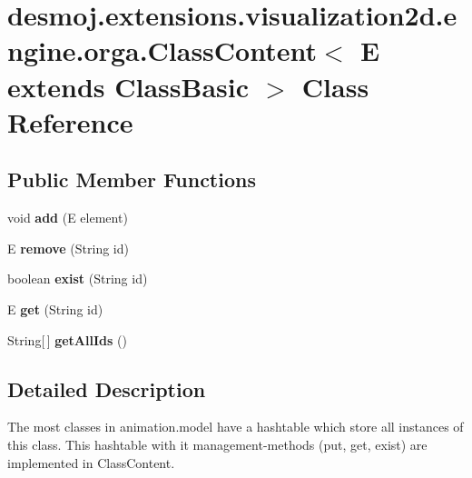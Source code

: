 \section{desmoj.\-extensions.\-visualization2d.\-engine.\-orga.\-Class\-Content$<$ E extends Class\-Basic $>$ Class Reference}
\label{classdesmoj_1_1extensions_1_1visualization2d_1_1engine_1_1orga_1_1_class_content_3_01_e_01extends_01_class_basic_01_4}
\subsection*{Public Member Functions}
\begin{DoxyCompactItemize}
\item 
void {\bfseries add} (E element)\label{classdesmoj_1_1extensions_1_1visualization2d_1_1engine_1_1orga_1_1_class_content_3_01_e_01extends_01_class_basic_01_4_a566ec81c9cf5318c56b14a6bfaae3496}

\item 
E {\bfseries remove} (String id)\label{classdesmoj_1_1extensions_1_1visualization2d_1_1engine_1_1orga_1_1_class_content_3_01_e_01extends_01_class_basic_01_4_a77266b23f22a7254b2f964ccc2f2f4f8}

\item 
boolean {\bfseries exist} (String id)\label{classdesmoj_1_1extensions_1_1visualization2d_1_1engine_1_1orga_1_1_class_content_3_01_e_01extends_01_class_basic_01_4_a4b407acd1d61c18869d7374e68994487}

\item 
E {\bfseries get} (String id)\label{classdesmoj_1_1extensions_1_1visualization2d_1_1engine_1_1orga_1_1_class_content_3_01_e_01extends_01_class_basic_01_4_a72f0ae45fbca25d3fa3935b7dd2cd9e9}

\item 
String[$\,$] {\bfseries get\-All\-Ids} ()\label{classdesmoj_1_1extensions_1_1visualization2d_1_1engine_1_1orga_1_1_class_content_3_01_e_01extends_01_class_basic_01_4_a311ece6e8d3a4a14d460f1f563f1b2b8}

\end{DoxyCompactItemize}


\subsection{Detailed Description}
The most classes in animation.\-model have a hashtable which store all instances of this class. This hashtable with it management-\/methods (put, get, exist) are implemented in Class\-Content.

